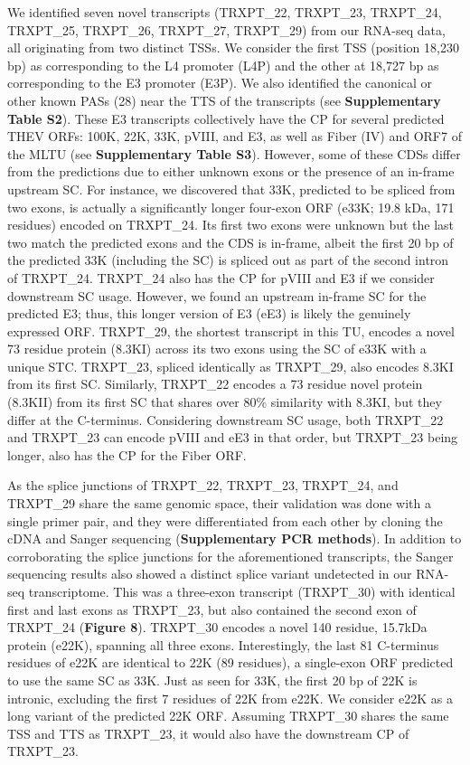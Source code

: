 \documentclass[
]{article}
\begin{document}
We identified seven novel transcripts (TRXPT\_22, TRXPT\_23, TRXPT\_24,
TRXPT\_25, TRXPT\_26, TRXPT\_27, TRXPT\_29) from our RNA-seq data, all
originating from two distinct TSSs. We consider the first TSS (position
18,230 bp) as corresponding to the L4 promoter (L4P) and the other at
18,727 bp as corresponding to the E3 promoter (E3P). We also identified
the canonical or other known PASs (28) near the TTS of the transcripts
(see \textbf{Supplementary Table S2}). These E3 transcripts collectively
have the CP for several predicted THEV ORFs: 100K, 22K, 33K, pVIII, and
E3, as well as Fiber (IV) and ORF7 of the MLTU (see
\textbf{Supplementary Table S3}). However, some of these CDSs differ
from the predictions due to either unknown exons or the presence of an
in-frame upstream SC. For instance, we discovered that 33K, predicted to
be spliced from two exons, is actually a significantly longer four-exon
ORF (e33K; 19.8 kDa, 171 residues) encoded on TRXPT\_24. Its first two
exons were unknown but the last two match the predicted exons and the
CDS is in-frame, albeit the first 20 bp of the predicted 33K (including
the SC) is spliced out as part of the second intron of TRXPT\_24.
TRXPT\_24 also has the CP for pVIII and E3 if we consider downstream SC
usage. However, we found an upstream in-frame SC for the predicted E3;
thus, this longer version of E3 (eE3) is likely the genuinely expressed
ORF. TRXPT\_29, the shortest transcript in this TU, encodes a novel 73
residue protein (8.3KI) across its two exons using the SC of e33K with a
unique STC. TRXPT\_23, spliced identically as TRXPT\_29, also encodes
8.3KI from its first SC. Similarly, TRXPT\_22 encodes a 73 residue novel
protein (8.3KII) from its first SC that shares over 80\% similarity with
8.3KI, but they differ at the C-terminus. Considering downstream SC
usage, both TRXPT\_22 and TRXPT\_23 can encode pVIII and eE3 in that
order, but TRXPT\_23 being longer, also has the CP for the Fiber ORF.

As the splice junctions of TRXPT\_22, TRXPT\_23, TRXPT\_24, and
TRXPT\_29 share the same genomic space, their validation was done with a
single primer pair, and they were differentiated from each other by
cloning the cDNA and Sanger sequencing (\textbf{Supplementary PCR
methods}). In addition to corroborating the splice junctions for the
aforementioned transcripts, the Sanger sequencing results also showed a
distinct splice variant undetected in our RNA-seq transcriptome. This
was a three-exon transcript (TRXPT\_30) with identical first and last
exons as TRXPT\_23, but also contained the second exon of TRXPT\_24
(\textbf{Figure 8}). TRXPT\_30 encodes a novel 140 residue, 15.7kDa
protein (e22K), spanning all three exons. Interestingly, the last 81
C-terminus residues of e22K are identical to 22K (89 residues), a
single-exon ORF predicted to use the same SC as 33K. Just as seen for
33K, the first 20 bp of 22K is intronic, excluding the first 7 residues
of 22K from e22K. We consider e22K as a long variant of the predicted
22K ORF. Assuming TRXPT\_30 shares the same TSS and TTS as TRXPT\_23, it
would also have the downstream CP of TRXPT\_23.
\end{document}
